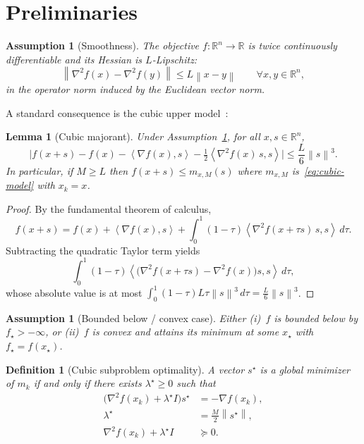 \documentclass[11pt,a4paper]{article}
\newtheorem{lemma}[theorem]{Lemma}
\newtheorem{assumption}[theorem]{Assumption}
\newtheorem{definition}[theorem]{Definition}
\newcommand{\R}{\mathbb{R}}
\newcommand{\norm}[1]{\left\|#1\right\|}
\newcommand{\inner}[2]{\left\langle #1,#2\right\rangle}
\newcommand{\grad}{\nabla}
\newcommand{\hess}{\nabla^{2}}
\begin{document}
\section{Preliminaries}
\label{sec:prelim}

\begin{assumption}[Smoothness]
\label{ass:lipschitz-hess}
The objective $f:\R^{n}\to\R$ is twice continuously differentiable and its Hessian is $L$-Lipschitz:
\begin{equation}
\norm{\hess f(x)-\hess f(y)}
\le
L\norm{x-y}
\qquad\forall x,y\in\R^{n},
\end{equation}
in the operator norm induced by the Euclidean vector norm.
\end{assumption}

A standard consequence is the cubic upper model~\cite{nesterov2006cubic}:
\begin{lemma}[Cubic majorant]
\label{lem:cubic-majorant}
Under Assumption~\ref{ass:lipschitz-hess}, for all $x,s\in\R^{n}$,
\begin{equation}
\label{eq:majorant}
\bigl|f(x+s)-f(x)-\inner{\grad f(x)}{s}-\tfrac12\inner{\hess f(x)\,s}{s}\bigr|
\le
\frac{L}{6}\norm{s}^{3}.
\end{equation}
In particular, if $M\ge L$ then $f(x+s)\le m_{x,M}(s)$ where $m_{x,M}$ is~\eqref{eq:cubic-model} with $x_{k}=x$.
\end{lemma}

\begin{proof}
By the fundamental theorem of calculus,
\[
f(x+s)
=
f(x)+\inner{\grad f(x)}{s}
+
\int_{0}^{1}(1-\tau)\inner{\hess f(x+\tau s)\,s}{s}\,d\tau.
\]
Subtracting the quadratic Taylor term yields
\[
\int_{0}^{1}(1-\tau)\inner{\bigl(\hess f(x+\tau s)-\hess f(x)\bigr)s}{s}\,d\tau,
\]
whose absolute value is at most
$\int_{0}^{1}(1-\tau)L\tau\norm{s}^{3}\,d\tau=\frac{L}{6}\norm{s}^{3}$.
\end{proof}

\begin{assumption}[Bounded below / convex case]
\label{ass:bounded}
Either (i)~$f$ is bounded below by $f_{\star}>-\infty$, or (ii)~$f$ is convex and attains its minimum at some $x_{\star}$ with $f_{\star}=f(x_{\star})$.
\end{assumption}

\begin{definition}[Cubic subproblem optimality]
\label{def:subopt}
A vector $s^{\star}$ is a global minimizer of $m_{k}$ if and only if there exists $\lambda^{\star}\ge 0$ such that~\cite{conn2000trust}
\begin{align}
\bigl(\hess f(x_{k})+\lambda^{\star} I\bigr)s^{\star}
&=
-\grad f(x_{k}),
\label{eq:opt-lin}\\
\lambda^{\star}
&=
\tfrac{M}{2}\norm{s^{\star}},
\label{eq:opt-sec}\\
\hess f(x_{k})+\lambda^{\star} I
&\succeq 0.
\label{eq:opt-psd}
\end{align}
\end{definition}
\end{document}
